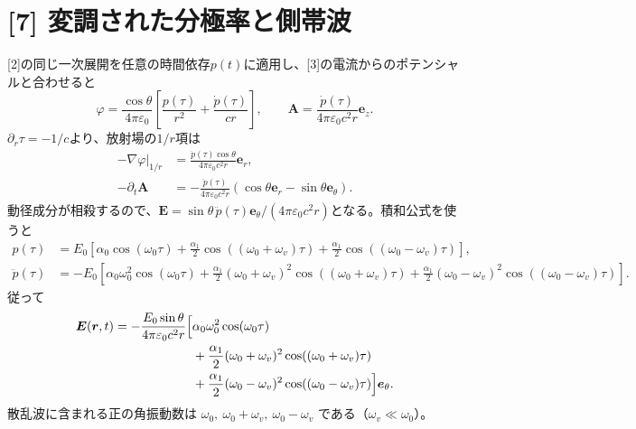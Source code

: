 \documentclass[11pt,a4paper]{article}
\begin{document}
\section*{[7] 変調された分極率と側帯波}
[2]の同じ一次展開を任意の時間依存$p(t)$に適用し、[3]の電流からのポテンシャルと合わせると
\begin{equation}
 \varphi=\frac{\cos\theta}{4\pi\varepsilon_0}
 \left[\frac{p(\tau)}{r^2}+\frac{\dot p(\tau)}{cr}\right],\qquad
 \boldsymbol A=\frac{\dot p(\tau)}{4\pi\varepsilon_0c^2r}\boldsymbol e_z.
\end{equation}
$\partial_r\tau=-1/c$より、放射場の$1/r$項は
\begin{align}
 -\nabla\varphi\big|_{1/r}
 &=\frac{\ddot p(\tau)\cos\theta}{4\pi\varepsilon_0c^2r}\boldsymbol e_r,\\
 -\partial_t\boldsymbol A
 &=-\frac{\ddot p(\tau)}{4\pi\varepsilon_0c^2r}
 (\cos\theta\boldsymbol e_r-\sin\theta\boldsymbol e_\theta).
\end{align}
動径成分が相殺するので、$\boldsymbol E=\sin\theta\,\ddot p(\tau)\boldsymbol e_\theta/(4\pi\varepsilon_0c^2r)$となる。積和公式を使うと
\begin{align*}
 p(\tau)&=E_0\left[\alpha_0\cos(\omega_0\tau)+\frac{\alpha_1}{2}\cos((\omega_0+\omega_v)\tau)+\frac{\alpha_1}{2}\cos((\omega_0-\omega_v)\tau)\right],\\
 \ddot p(\tau)&=-E_0\left[\alpha_0\omega_0^2\cos(\omega_0\tau)
 +\frac{\alpha_1}{2}(\omega_0+\omega_v)^2\cos((\omega_0+\omega_v)\tau)
 +\frac{\alpha_1}{2}(\omega_0-\omega_v)^2\cos((\omega_0-\omega_v)\tau)\right].
\end{align*}
従って
\[
\begin{aligned}
\boldsymbol E(\boldsymbol r,t)=-\frac{E_0\sin\theta}{4\pi\varepsilon_0c^2r}\Bigl[&\alpha_0\omega_0^2\cos(\omega_0\tau)\\
&+\frac{\alpha_1}{2}(\omega_0+\omega_v)^2\cos((\omega_0+\omega_v)\tau)\\
&+\frac{\alpha_1}{2}(\omega_0-\omega_v)^2\cos((\omega_0-\omega_v)\tau)\Bigr]\boldsymbol e_\theta.
\end{aligned}
\]
散乱波に含まれる正の角振動数は $\boxed{\omega_0,\ \omega_0+\omega_v,\ \omega_0-\omega_v}$ である（$\omega_v\ll\omega_0$）。
\end{document}
